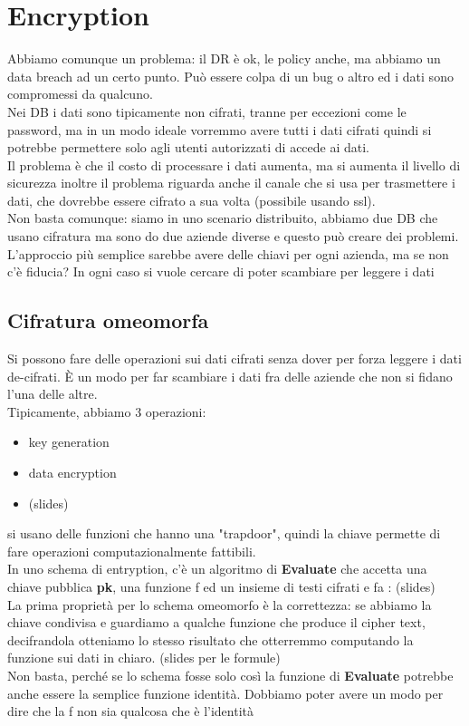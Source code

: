 \documentclass[12pt, oneside]{extbook} %
\begin{document}
\section{Encryption}
Abbiamo comunque un problema: il DR è ok, le policy anche, ma abbiamo un data breach ad un certo punto. Può essere colpa di un bug o altro ed i dati sono compromessi da qualcuno.\\Nei DB i dati sono tipicamente non cifrati, tranne per eccezioni come le password, ma in un modo ideale vorremmo avere tutti i dati cifrati quindi si potrebbe permettere solo agli utenti autorizzati di accede ai dati.\\Il problema è che il costo di processare i dati aumenta, ma si aumenta il livello di sicurezza inoltre il problema riguarda anche il canale che si usa per trasmettere i dati, che dovrebbe essere cifrato a sua volta (possibile usando ssl).\\Non basta comunque: siamo in uno scenario distribuito, abbiamo due DB che usano cifratura ma sono do due aziende diverse e questo può creare dei problemi. L'approccio più semplice sarebbe avere delle chiavi per ogni azienda, ma se non c'è fiducia? In ogni caso si vuole cercare di poter scambiare per leggere i dati
\subsection{Cifratura omeomorfa}
Si possono fare delle operazioni sui dati cifrati senza dover per forza leggere i dati de-cifrati. È un modo per far scambiare i dati fra delle aziende che non si fidano l'una delle altre.\\Tipicamente, abbiamo 3 operazioni:
\begin{itemize}
	\item key generation
	\item data encryption
	\item (slides)
\end{itemize}
si usano delle funzioni che hanno una "trapdoor", quindi la chiave permette di fare operazioni computazionalmente fattibili.\\In uno schema di entryption, c'è un algoritmo di \textbf{Evaluate} che accetta una chiave pubblica \textbf{pk}, una funzione f ed un insieme di testi cifrati e fa : (slides)\\La prima proprietà per lo schema omeomorfo è la correttezza: se abbiamo la chiave condivisa e guardiamo a qualche funzione che produce il cipher text, decifrandola otteniamo lo stesso risultato che otterremmo computando la funzione sui dati in chiaro. (slides per le formule)\\Non basta, perché se lo schema fosse solo così la funzione di \textbf{Evaluate} potrebbe anche essere la semplice funzione identità. Dobbiamo poter avere un modo per dire che la f non sia qualcosa che è l'identità
\end{document}
